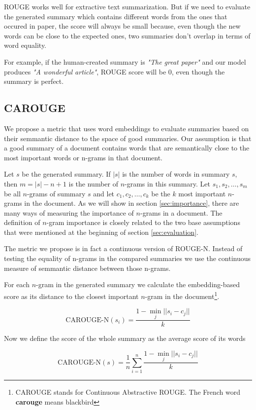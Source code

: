 \documentclass[sigplan]{acmart}
\begin{document}
ROUGE works well for extractive text summarization. But if we need to evaluate the generated summary which contains different words from the ones that occured in paper, the score will always be small because, even though the new words can be close to the expected ones, two summaries don't overlap in terms of word equality.

For example, if the human-created summary is \textit{"The great paper"} and our model produces \textit{"A wonderful article"}, ROUGE score will be $0$, even though the summary is perfect.

\subsection{CAROUGE}

We propose a metric that uses word embeddings to evaluate summaries based on their semmantic distance to the space of good summaries. Our assumption is that a good summary of a document contains words that are semantically close to the most important words or n-grams in that document.

Let $s$ be the generated summary. If $|s|$ is the number of words in summary $s$, then $m=|s|-n+1$ is the number of $n$-grams in this summary. Let $s_1, s_2, \dots, s_m$ be all $n$-grams of summary $s$ and let $c_1, c_2, \dots, c_k$ be the $k$ most important $n$-grams in the document. As we will show in section \ref{sec:importance}, there are many ways of measuring the importance of $n$-grams in a document. The definition of $n$-gram importance is closely related to the two base assumptions that were mentioned at the beginning of section \ref{sec:evaluation}.

The metric we propose is in fact a continuous version of ROUGE-N. Instead of testing the equality of n-grams in the compared summaries we use the continuous measure of semmantic distance between those n-grams.

For each $n$-gram in the generated summary we calculate the embedding-based score as its distance to the closest important $n$-gram in the document\footnote{CAROUGE stands for Continuous Abstractive ROUGE. The French word \textbf{carouge} means blackbird}.

\[ \text{CAROUGE-N}(s_i) = \frac{1 - \operatorname*{min}_j ||s_i - c_j||}{k} \]

Now we define the score of the whole summary as the average score of its words

\[ \text{CAROUGE-N}(s) = \frac1n \sum_{i=1}^n \frac{1 - \operatorname*{min}_j ||s_i - c_j||}{k} \]
\end{document}
